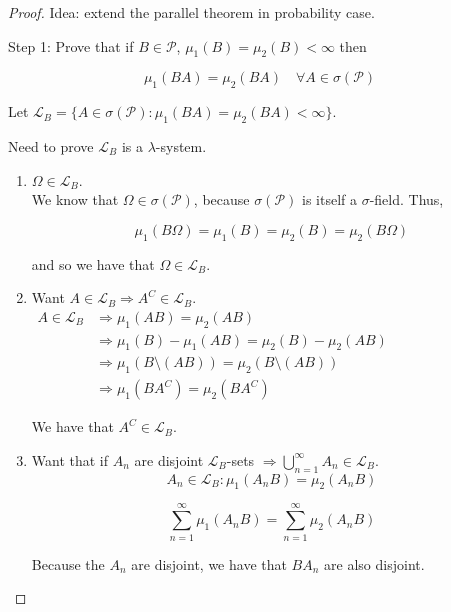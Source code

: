 \documentclass[11pt,fleqn]{book} %
\begin{document}
\begin{proof}
	Idea: extend the parallel theorem in probability case. 

	Step 1: Prove that if $B \in \mathcal{P}$, $\mu_1 (B) = \mu_2(B) < \infty$ then

			$$\mu_1(BA) = \mu_2 (BA) \quad \forall A \in \sigma(\mathcal{P})  $$


			Let $\mathcal{L}_B = \{A \in \sigma(\mathcal{P}): \mu_1(BA) = \mu_2(BA) < \infty \}$.

			Need to prove $\mathcal{L}_B$ is a $\lambda$-system.

			\begin{enumerate}
				\item $\Omega \in \mathcal{L}_B$. \\

				We know that $\Omega \in \sigma(\mathcal{P})$, because $\sigma(\mathcal{P})$ is itself a $\sigma$-field. Thus, 

						$$\mu_1(B \Omega) = \mu_1(B) = \mu_2(B) = \mu_2(B\Omega) $$

				and so we have that $\Omega \in \mathcal{L}_B$.

				\item Want $A \in \mathcal{L}_B \Rightarrow A^C \in \mathcal{L}_B$.\\

					$\begin{aligned}
						A \in \mathcal{L}_B &\Rightarrow \mu_1(AB) = \mu_2(AB) \\
						&\Rightarrow \mu_1(B) - \mu_1(AB) = \mu_2(B) - \mu_2(AB)\\
						&\Rightarrow \mu_1(B \setminus (AB)) = \mu_2(B \setminus (AB))\\	
						&\Rightarrow \mu_1(BA^C) = \mu_2 (BA^C)
					\end{aligned}$

				We have that $A^C \in \mathcal{L}_B$. 

				\item Want that if $A_n$ are disjoint $\mathcal{L}_B$-sets $\Rightarrow \bigcup^\infty_{n=1} A_n \in \mathcal{L}_B$.\\

				$$A_n \in \mathcal{L}_B: \mu_1(A_n B) = \mu_2(A_n B) $$

				$$\displaystyle \sum^\infty_{n=1} \mu_1(A_n B) = \displaystyle \sum^\infty_{n=1} \mu_2(A_n B) $$

				Because the $A_n$ are disjoint, we have that $B A_n $ are also disjoint.


\end{enumerate}
\end{proof}
\end{document}
